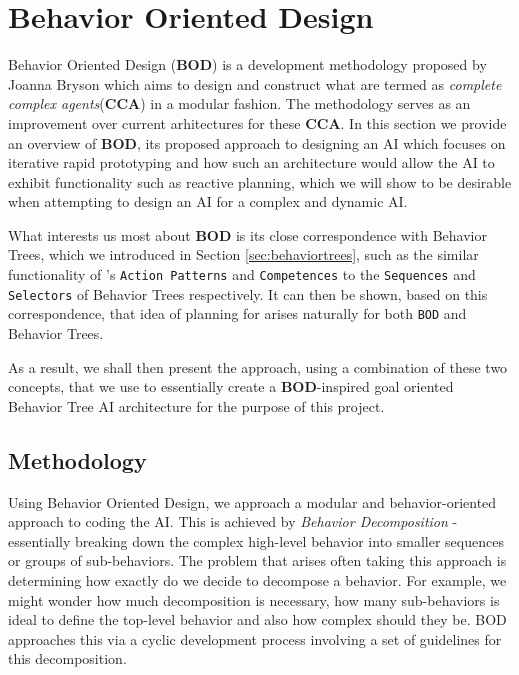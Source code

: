     \newpage    
        \section{Behavior Oriented Design}
        \label{sec:bod}
        
        Behavior Oriented Design (\textbf{BOD}) is a development methodology proposed by Joanna Bryson \cite{bod} which aims to design and construct what are termed as \emph{complete complex agents}(\textbf{CCA}) in a modular fashion. The methodology serves as an improvement over current arhitectures for these \textbf{CCA}. In this section we provide an overview of \textbf{BOD}, its proposed approach to designing an AI which focuses on iterative rapid prototyping and how such an architecture would allow the AI to exhibit functionality such as reactive planning, which we will show to be desirable when attempting to design an AI for a complex and dynamic AI.     
        
        What interests us most about \textbf{BOD} is its close correspondence with Behavior Trees, which we introduced in Section \ref{sec:behaviortrees}, such as the similar functionality of 's \texttt{Action Patterns} and \texttt{Competences} to the \texttt{Sequences} and \texttt{Selectors} of Behavior Trees respectively. It can then be shown, based on this correspondence, that idea of planning for arises naturally for both \texttt{BOD} and Behavior Trees.
        
        As a result, we shall then present the approach, using a combination of these two concepts, that we use to essentially create a \textbf{BOD}-inspired goal oriented Behavior Tree AI architecture for the purpose of this project.
        
        \subsection{Methodology}
        
        Using Behavior Oriented Design, we approach a modular and behavior-oriented approach to coding the AI. This is achieved by \emph{Behavior Decomposition} - essentially breaking down the complex high-level behavior into smaller sequences or groups of sub-behaviors. The problem that arises often taking this approach is determining how exactly do we decide to decompose a behavior. For example, we might wonder how much decomposition is necessary, how many sub-behaviors is ideal to define the top-level behavior and also how complex should they be. BOD approaches this via a cyclic development process involving a set of guidelines for this decomposition.
        
